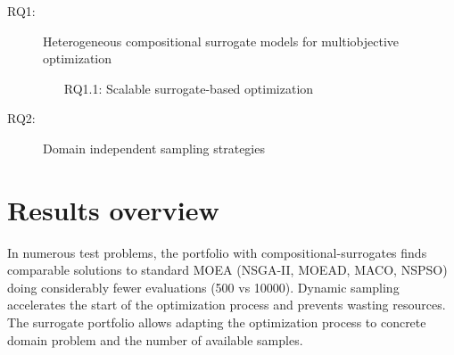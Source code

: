     \begin{description}
        \item[RQ1:\label{RQ1}] Heterogeneous compositional surrogate models for multiobjective optimization
        \begin{itemize}
            \item[RQ1.1:\label{RQ1.1}] Scalable surrogate-based optimization
        \end{itemize}
        \item[RQ2:\label{RQ2}] Domain independent sampling strategies
    \end{description}

\section{Results overview}
    In numerous test problems, the portfolio with compositional-surrogates finds comparable solutions to standard MOEA (NSGA-II, MOEAD, MACO, NSPSO) doing considerably fewer evaluations (500 vs 10000). Dynamic sampling accelerates the start of the optimization process and prevents wasting resources. The surrogate portfolio allows adapting the optimization process to concrete domain problem and the number of available samples. 



